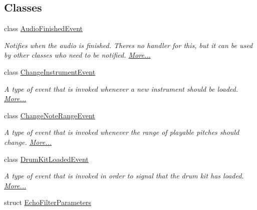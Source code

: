 \subsection*{Classes}
\begin{DoxyCompactItemize}
\item 
class \hyperlink{group___v_i_m_event_types_class_virtual_instrument_manager_1_1_audio_finished_event}{Audio\+Finished\+Event}
\begin{DoxyCompactList}\small\item\em Notifies when the audio is finished. There\textquotesingle{}s no handler for this, but it can be used by other classes who need to be notified.  \hyperlink{group___v_i_m_event_types_class_virtual_instrument_manager_1_1_audio_finished_event}{More...}\end{DoxyCompactList}\item 
class \hyperlink{group___v_i_m_event_types_class_virtual_instrument_manager_1_1_change_instrument_event}{Change\+Instrument\+Event}
\begin{DoxyCompactList}\small\item\em A type of event that is invoked whenever a new instrument should be loaded.  \hyperlink{group___v_i_m_event_types_class_virtual_instrument_manager_1_1_change_instrument_event}{More...}\end{DoxyCompactList}\item 
class \hyperlink{group___v_i_m_event_types_class_virtual_instrument_manager_1_1_change_note_range_event}{Change\+Note\+Range\+Event}
\begin{DoxyCompactList}\small\item\em A type of event that is invoked whenever the range of playable pitches should change.  \hyperlink{group___v_i_m_event_types_class_virtual_instrument_manager_1_1_change_note_range_event}{More...}\end{DoxyCompactList}\item 
class \hyperlink{group___v_i_m_event_types_class_virtual_instrument_manager_1_1_drum_kit_loaded_event}{Drum\+Kit\+Loaded\+Event}
\begin{DoxyCompactList}\small\item\em A type of event that is invoked in order to signal that the drum kit has loaded.  \hyperlink{group___v_i_m_event_types_class_virtual_instrument_manager_1_1_drum_kit_loaded_event}{More...}\end{DoxyCompactList}\item 
struct \hyperlink{group__filter_params_struct_virtual_instrument_manager_1_1_echo_filter_parameters}{Echo\+Filter\+Parameters}

\end{DoxyCompactItemize}
